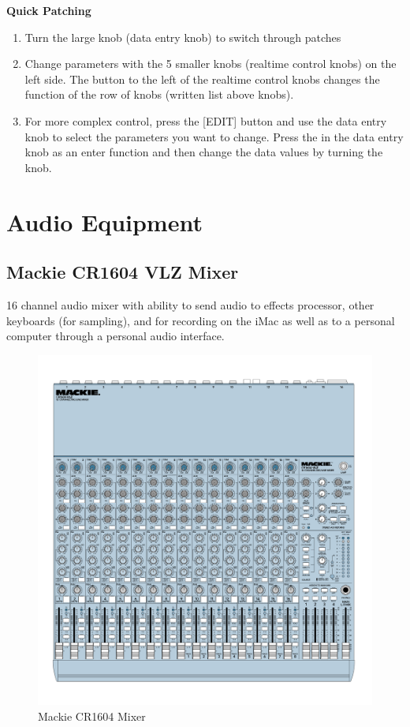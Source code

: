 \documentclass{tufte-book} %
\begin{document}
\begin{fullwidth}
\textbf{Quick Patching}\\
\begin{enumerate}
	\item Turn the large knob (data entry knob) to switch through patches 
	\item Change parameters with the 5 smaller knobs (realtime control knobs) on the left side. The button to the left of the realtime control knobs changes the function of the row of knobs (written list above knobs). 
	\item For more complex control, press the [EDIT] button and use the data entry knob to select the parameters you want to change. Press the in the data entry knob as an enter function and then change the data values by turning the knob.
\end{enumerate}
\end{fullwidth}

\newpage
\section{Audio Equipment}
\subsection{Mackie CR1604 VLZ Mixer}

\begin{fullwidth}
16 channel audio mixer with ability to send audio to effects processor, other keyboards (for sampling), and for recording on the iMac as well as to a personal computer through a personal audio interface.
\end{fullwidth}

\begin{figure}[h]
\centering
\includegraphics[width=.85\textwidth]{LaTeX/Mackie_Manual-1.png}
\caption{Mackie CR1604 Mixer}
\label{fig:fullfig}
\end{figure}
\end{document}
